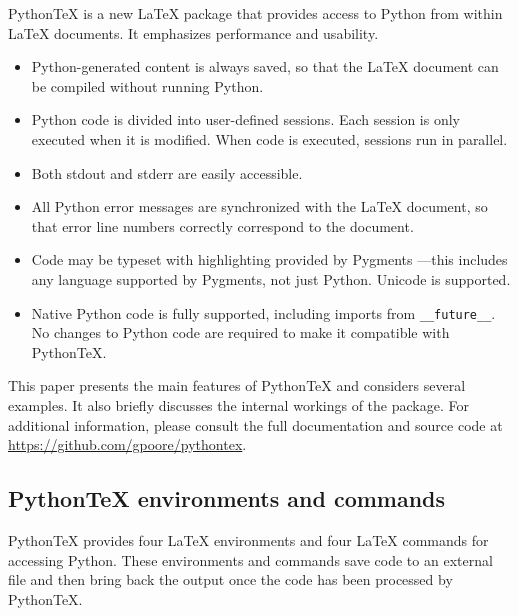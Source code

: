 \documentclass[letterpaper,compsoc,twoside]{IEEEtran}
\begin{document}
PythonTeX is a new LaTeX package that provides access to Python from
within LaTeX documents. It emphasizes performance and usability.%
\begin{itemize}

\item 

Python-generated content is always saved, so that the LaTeX document
can be compiled without running Python.
\item 

Python code is divided into user-defined sessions. Each session is
only executed when it is modified. When code is executed, sessions run
in parallel.
\item 

Both stdout and stderr are easily accessible.
\item 

All Python error messages are synchronized with the LaTeX document, so
that error line numbers correctly correspond to the document.
\item 

Code may be typeset with highlighting provided by Pygments \cite{Pyg}—this
includes any language supported by Pygments, not just Python.
Unicode is supported.
\item 

Native Python code is fully supported, including imports from
\texttt{\_\_future\_\_}.  No changes to Python code are required to make
it compatible with PythonTeX.
\end{itemize}


This paper presents the main features of PythonTeX and considers
several examples.  It also briefly discusses the internal workings of
the package. For additional information, please consult the full
documentation and source code at \url{https://github.com/gpoore/pythontex}.

\subsection{PythonTeX environments and commands%
  \label{pythontex-environments-and-commands}%
}


PythonTeX provides four LaTeX environments and four LaTeX commands for
accessing Python. These environments and commands save code to an
external file and then bring back the output once the code has been
processed by PythonTeX.
\end{document}
